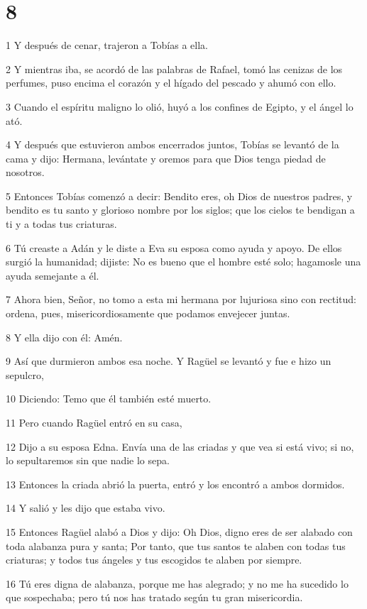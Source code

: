 \chapter{8}

\par 1 Y después de cenar, trajeron a Tobías a ella.
\par 2 Y mientras iba, se acordó de las palabras de Rafael, tomó las cenizas de los perfumes, puso encima el corazón y el hígado del pescado y ahumó con ello.
\par 3 Cuando el espíritu maligno lo olió, huyó a los confines de Egipto, y el ángel lo ató.
\par 4 Y después que estuvieron ambos encerrados juntos, Tobías se levantó de la cama y dijo: Hermana, levántate y oremos para que Dios tenga piedad de nosotros.
\par 5 Entonces Tobías comenzó a decir: Bendito eres, oh Dios de nuestros padres, y bendito es tu santo y glorioso nombre por los siglos; que los cielos te bendigan a ti y a todas tus criaturas.
\par 6 Tú creaste a Adán y le diste a Eva su esposa como ayuda y apoyo. De ellos surgió la humanidad; dijiste: No es bueno que el hombre esté solo; hagamosle una ayuda semejante a él.
\par 7 Ahora bien, Señor, no tomo a esta mi hermana por lujuriosa sino con rectitud: ordena, pues, misericordiosamente que podamos envejecer juntas.
\par 8 Y ella dijo con él: Amén.
\par 9 Así que durmieron ambos esa noche. Y Ragüel se levantó y fue e hizo un sepulcro,
\par 10 Diciendo: Temo que él también esté muerto.
\par 11 Pero cuando Ragüel entró en su casa,
\par 12 Dijo a su esposa Edna. Envía una de las criadas y que vea si está vivo; si no, lo sepultaremos sin que nadie lo sepa.
\par 13 Entonces la criada abrió la puerta, entró y los encontró a ambos dormidos.
\par 14 Y salió y les dijo que estaba vivo.
\par 15 Entonces Ragüel alabó a Dios y dijo: Oh Dios, digno eres de ser alabado con toda alabanza pura y santa; Por tanto, que tus santos te alaben con todas tus criaturas; y todos tus ángeles y tus escogidos te alaben por siempre.
\par 16 Tú eres digna de alabanza, porque me has alegrado; y no me ha sucedido lo que sospechaba; pero tú nos has tratado según tu gran misericordia.
